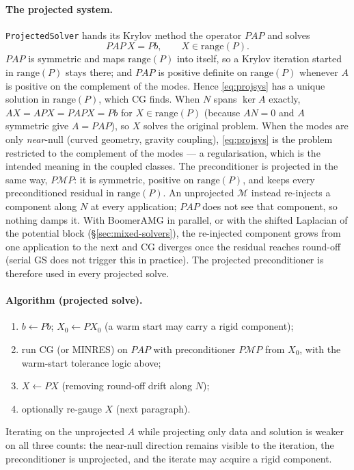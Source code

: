 \documentclass[11pt]{article}
\numberwithin{equation}{section}
\theoremstyle{remark}
\newcommand{\code}[1]{\texttt{#1}}
\begin{document}
\paragraph{The projected system.} \code{ProjectedSolver} hands its Krylov
method the operator $PAP$ and solves
\begin{equation}
  PAP\,X = Pb, \qquad X\in\mathrm{range}(P) .
  \label{eq:projsys}
\end{equation}
$PAP$ is symmetric and maps $\mathrm{range}(P)$ into itself, so a Krylov
iteration started in $\mathrm{range}(P)$ stays there; and $PAP$ is
positive definite on $\mathrm{range}(P)$ whenever $A$ is positive on the
complement of the modes. Hence \eqref{eq:projsys} has a unique solution in
$\mathrm{range}(P)$, which CG finds. When $N$ spans $\ker A$ exactly,
$AX = APX = PAPX = Pb$ for $X\in\mathrm{range}(P)$ (because $AN = 0$ and
$A$ symmetric give $A = PAP$), so $X$ solves the original problem. When the
modes are only \emph{near}-null (curved geometry, gravity coupling),
\eqref{eq:projsys} is the problem restricted to the complement of the
modes --- a regularisation, which is the intended meaning in the coupled
classes. The preconditioner is projected in the same way, $P\mathcal{M}P$:
it is symmetric, positive on $\mathrm{range}(P)$, and keeps every
preconditioned residual in $\mathrm{range}(P)$. An unprojected
$\mathcal{M}$ instead re-injects a component along $N$ at every
application; $PAP$ does not see that component, so nothing damps it. With
BoomerAMG in parallel, or with the shifted Laplacian of the potential block
(\S\ref{sec:mixed-solvers}), the re-injected component grows from one
application to the next and CG diverges once the residual reaches
round-off (serial GS does not trigger this in practice). The projected
preconditioner is therefore used in every projected solve.

\paragraph{Algorithm (projected solve).}
\begin{enumerate}
\item $b \leftarrow Pb$; $X_0 \leftarrow PX_0$ (a warm start may carry a
  rigid component);
\item run CG (or MINRES) on $PAP$ with preconditioner $P\mathcal{M}P$ from
  $X_0$, with the warm-start tolerance logic above;
\item $X \leftarrow PX$ (removing round-off drift along $N$);
\item optionally re-gauge $X$ (next paragraph).
\end{enumerate}
Iterating on the unprojected $A$ while projecting only data and solution
is weaker on all three counts: the near-null direction remains visible to
the iteration, the preconditioner is unprojected, and the iterate may
acquire a rigid component.
\end{document}
